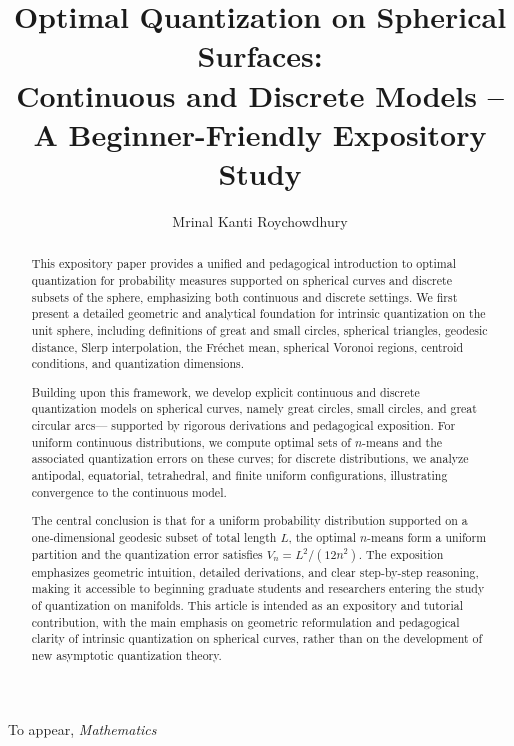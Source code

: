 \documentclass[12pt, reqno]{amsart}
\theoremstyle{plain}
\theoremstyle{definition}
\newcommand{\tit}{\textit}%
\newcommand{\nd}{\noindent}
\begin{document}
 
 \nd To appear,\tit{ Mathematics} 
	\title{Optimal Quantization on Spherical Surfaces: \\
Continuous and Discrete Models -- A Beginner-Friendly Expository Study}
 
 \author{Mrinal Kanti Roychowdhury}
\address{Department of Mathematics and Statistical Science, University of Texas Rio Grande Valley, Edinburg, TX 78539, USA}

	
	
	\date{}
	\maketitle
	
	\pagestyle{myheadings}
 \begin{abstract}
 
 This expository paper provides a unified and pedagogical introduction to optimal
quantization for probability measures supported on spherical curves and discrete subsets of the sphere, emphasizing both
continuous and discrete settings. We first present a detailed geometric and analytical
foundation for intrinsic quantization on the unit sphere, including definitions of
great and small circles, spherical triangles, geodesic distance, Slerp interpolation,
the Fr\'echet mean, spherical Voronoi regions, centroid conditions, and quantization
dimensions.

Building upon this framework, we develop explicit continuous and discrete quantization
models on spherical curves, namely great circles, small circles, and great circular arcs—
supported by rigorous derivations and pedagogical exposition. For uniform continuous
distributions, we compute optimal sets of $n$-means and the associated quantization
errors on these curves; for discrete distributions, we analyze antipodal, equatorial,
tetrahedral, and finite uniform configurations, illustrating convergence to the
continuous model.

The central conclusion is that for a uniform probability distribution supported on a
one-dimensional geodesic subset of total length $L$, the optimal $n$-means form a
uniform partition and the quantization error satisfies $V_n = L^2/(12n^2)$. The
exposition emphasizes geometric intuition, detailed derivations, and clear
step-by-step reasoning, making it accessible to beginning graduate students and
researchers entering the study of quantization on manifolds. This article is intended
as an expository and tutorial contribution, with the main emphasis on geometric
reformulation and pedagogical clarity of intrinsic quantization on spherical curves,
rather than on the development of new asymptotic quantization theory.
 \end{abstract}
	
\end{document}
